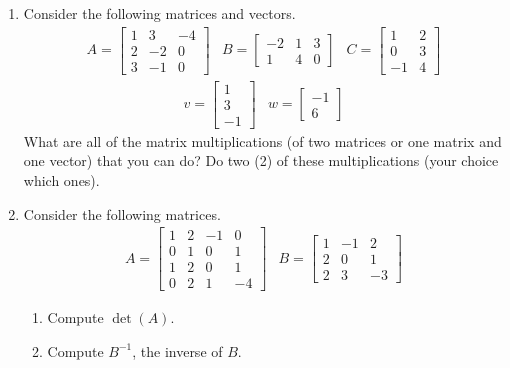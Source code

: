 \documentclass[10pt]{amsart}
\begin{document}
\begin{enumerate}

\item Consider the following matrices and vectors.
$$
\begin{array}{ccc}
A=\left[\begin{array}{rrr}1&3&-4\\2&-2&0\\3&-1&0\end{array}\right] &
B=\left[\begin{array}{rrr}-2&1&3\\1&4&0\end{array}\right] &
C=\left[\begin{array}{rr}1&2\\0&3\\-1&4\end{array}\right]
\end{array}
$$
$$
\begin{array}{cc}
v=\left[\begin{array}{r}1\\3\\-1\end{array}\right] &
w=\left[\begin{array}{r}-1\\6\end{array}\right]
\end{array}
$$
What are all of the matrix multiplications (of two matrices or one matrix
and one vector) that you can do?  Do two (2) of these multiplications
(your choice which ones).

\vfill\pagebreak


\item Consider the following matrices.
$$
\begin{array}{cc}
A=\left[\begin{array}{rrrr}1&2&-1&0\\0&1&0&1\\
			   1&2&0&1\\0&2&1&-4\end{array}\right]  &
B=\left[\begin{array}{rrr}1&-1&2\\2&0&1\\2&3&-3\end{array}\right] 
\end{array}
$$
\begin{enumerate}
\item Compute $\det(A)$.
\vfill
\item Compute $B^{-1}$, the inverse of $B$.
\end{enumerate}




\end{enumerate}
\end{document}
